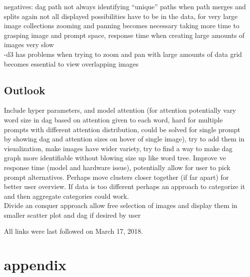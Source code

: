 \documentclass[
  a4paper,  %
  twoside,  %
  bibliography=totoc,
  headsepline,
  cleardoublepage=empty,
  parskip=half,
  draft=false
]{scrbook}
\begin{document}
negatives: dag path not always identifying \enquote{unique} paths when path merges and splits again not all displayed possibilities have to be in the data, 
for very large image collections zooming and panning becomes necessary taking more time to grasping image and prompt space, response time when creating large amounts of images very slow \\
-d3 has problems when trying to zoom and pan with large amounts of data grid becomes essential to view overlapping images



\section{Outlook}
Include hyper parameters, and model attention (for attention potentially vary word size in dag based on attention given to each word, hard for multiple prompts with different attention distribution, could be solved for single prompt by showing dag and attention sizes on hover of single image), try to add them in visualization, make images have wider variety, try to find a way to make dag graph more identifiable without blowing size up like word tree. Improve ve response time (model and hardware issue), potentially allow for user to pick prompt alternatives. Perhaps move clusters closer together (if far apart) for better user overview. If data is too different perhaps an approach to categorize it and then aggregate categories could work.\\
Divide an conquer approach allow free selection of images and display them in smaller scatter plot and dag if desired by user
\printbibliography

All links were last followed on March 17, 2018.

\appendix
%
\chapter{appendix}
\end{document}
